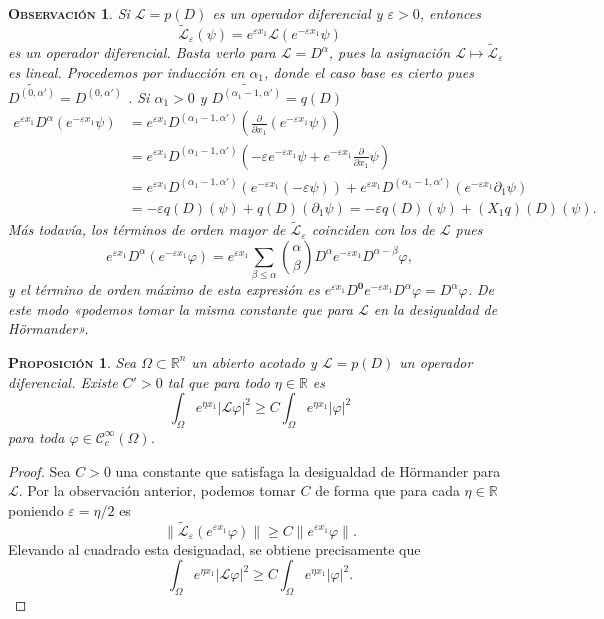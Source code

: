 \documentclass[11pt]{article}
\theoremstyle{colored}
\newtheorem{proposition}{\scshape Proposición}
\newtheorem{remark}{\scshape Observación}
\newcommand{\R}{\mathbb{R}}
\newcommand{\C}{\mathscr{C}}
\newcommand{\eps}{\varepsilon}
\newcommand{\guill}[1]{«#1»}
\renewcommand{\L}{\mathscr{L}}
\begin{document}
\begin{remark} Si $\L = p(D)$ es un operador diferencial y $\eps > 0$, entonces
\[
\widetilde{\L}_\eps(\psi) = e^{\eps x_1}\L(e^{-\eps x_1}\psi)
\]
es un operador diferencial. Basta verlo para $\L = D^\alpha$, pues la asignación $\L \mapsto \widetilde{\L}_\eps$ es lineal. Procedemos por inducción en $\alpha_1$, donde el caso base es cierto pues $\widetilde{D^{(0,\alpha')}} = D^{(0,\alpha')}$ . Si $\alpha_1 > 0$ y $\widetilde{D^{(\alpha_1 - 1, \alpha')}} = q(D)$
\begin{align*}
e^{\eps x_1}D^\alpha(e^{-\eps x_1}\psi) &= e^{\eps x_1}D^{(\alpha_1 - 1, \alpha')}\left(\frac{\partial}{\partial x_1}(e^{-\eps x_1}\psi)\right)\\
&= e^{\eps x_1}D^{(\alpha_1 - 1, \alpha')}\left(-\eps e^{-\eps x_1}\psi + e^{-\eps x_1}\frac{\partial}{\partial x_1}\psi\right)\\
&= e^{\eps x_1}D^{(\alpha_1 - 1, \alpha')}(e^{-\eps x_1}(-\eps\psi)) + e^{\eps x_1}D^{(\alpha_1 - 1, \alpha')}(e^{-\eps x_1}\partial_1\psi)\\
&= -\eps q(D)(\psi) + q(D)(\partial_1\psi) = -\eps q(D)(\psi) + (X_1q)(D)(\psi).
\end{align*}
Más todavía, los términos de orden mayor de $\widetilde{\L}_\eps$ coinciden con los de $\L$ pues
\[
e^{\eps x_1}D^\alpha (e^{-\eps x_1}\varphi) = e^{\eps x_1}\sum_{\beta \leq \alpha}{\alpha \choose \beta}D^\alpha e^{-\eps x_1}D^{\alpha - \beta}\varphi,
\]
y el término de orden máximo de esta expresión es $e^{\eps x_1}D^{\mathbf{0}}e^{-\eps x_1}D^{\alpha}\varphi = D^\alpha\varphi$. De este modo \guill{podemos tomar la misma constante que para $\L$ en la desigualdad de Hörmander}.
\end{remark}

\begin{proposition} \label{sharp-hormander-bound}Sea $\Omega \subset \R^n$ un abierto acotado y $\L = p(D)$ un operador diferencial. Existe $C' > 0$ tal que para todo $\eta \in \R$ es
\[
\int_{\Omega}e^{\eta x_1}|\L \varphi|^2 \geq C \int_{\Omega}e^{\eta x_1}|\varphi|^2
\]
para toda $\varphi \in \C_c^\infty(\Omega)$.
\end{proposition}
\begin{proof} Sea $C > 0$ una constante que satisfaga la desigualdad de Hörmander para $\L$. Por la observación anterior, podemos tomar $C$ de forma que para cada $\eta \in \R$ poniendo $\eps = \eta/2$ es
\[
\|\widetilde{\L}_\eps( e^{\eps x_1}\varphi)\| \geq C \|e^{\eps x_1}\varphi\|.
\]
Elevando al cuadrado esta desiguadad, se obtiene precisamente que
\[
\int_{\Omega}e^{\eta x_1}|\L \varphi|^2 \geq C \int_{\Omega}e^{\eta x_1}|\varphi|^2.
\]
\end{proof}
\end{document}

